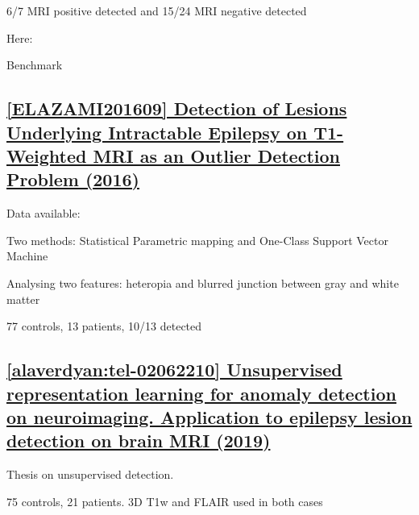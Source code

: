 6/7 MRI positive detected and 15/24 MRI negative detected

Here: 

\begin{table}[htbp]
	\centering
	\caption{Benchmark}

	\caption{Results from }%
	\label{tab:ul2}
\end{table}

\newpage
\subsection{\href{https://journals.plos.org/plosone/article?id=10.1371/journal.pone.0161498}{[ELAZAMI201609] Detection of Lesions Underlying Intractable Epilepsy on T1-Weighted MRI as an Outlier Detection Problem (2016)}}
\label{ul3}

Data available: 

Two methods: Statistical Parametric mapping and One-Class Support Vector Machine

Analysing two features: heteropia and blurred junction between gray and white matter

77 controls, 13 patients, 10/13 detected

\newpage
\subsection{\href{https://hal.science/tel-02062210v2/file/these.pdf}{[alaverdyan:tel-02062210] Unsupervised representation learning for anomaly detection on neuroimaging. Application to epilepsy lesion detection on brain MRI (2019)}}
\label{ul4}

Thesis on unsupervised detection. 

75 controls, 21 patients. 3D T1w and FLAIR used in both cases

